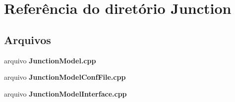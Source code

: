 \section{Referência do diretório Junction}
\label{dir_5452922e79fa1b546dc95499268148e9}
\subsection*{Arquivos}
\begin{DoxyCompactItemize}
\item 
arquivo {\bf Junction\+Model.\+cpp}
\item 
arquivo {\bf Junction\+Model\+Conf\+File.\+cpp}
\item 
arquivo {\bf Junction\+Model\+Interface.\+cpp}
\end{DoxyCompactItemize}
